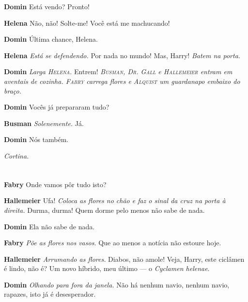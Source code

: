 \textbf{Domin} Está vendo? Pronto!

\textbf{Helena} Não, não! Solte-me! Você está me machucando!

\textbf{Domin} Última chance, Helena.

\textbf{Helena} \emph{Está se defendendo.} Por nada no mundo! Mas, Harry!
\emph{Batem na porta.}

\textbf{Domin} \emph{Larga \textsc{Helena}.} Entrem!
\emph{\textsc{Busman}, \textsc{Dr. Gall} e \textsc{Hallemeier} entram em aventais de cozinha.
\textsc{Fabry} carrega flores e \textsc{Alquist} um guardanapo embaixo do braço.}

\textbf{Domin} Vocês já prepararam tudo?

\textbf{Busman} \emph{Solenemente.} Já.

\textbf{Domin} Nós também.

\emph{Cortina.}


\chapter[Ato \textsc{i}]{}
\newact
\thispagestyle{empty}


\textbf{Fabry} Onde vamos pôr tudo isto?

\textbf{Hallemeier} Ufa! \emph{Coloca as flores no chão e faz o sinal da cruz na porta
à direita.} Durma, durma! Quem dorme pelo menos não sabe de nada.

\textbf{Domin} Ela não sabe de nada.

\textbf{Fabry} \emph{Põe as flores nos vasos.} Que ao menos a notícia não estoure
hoje.

\textbf{Hallemeier} \emph{Arrumando as flores.} Diabos, não amole! Veja, Harry, este
ciclâmen é lindo, não é? Um novo híbrido, meu último --- o \textit{Cyclamen helenae}.

\textbf{Domin} \emph{Olhando para fora da janela.} Não há nenhum navio, nenhum navio,
rapazes, isto já é desesperador.


